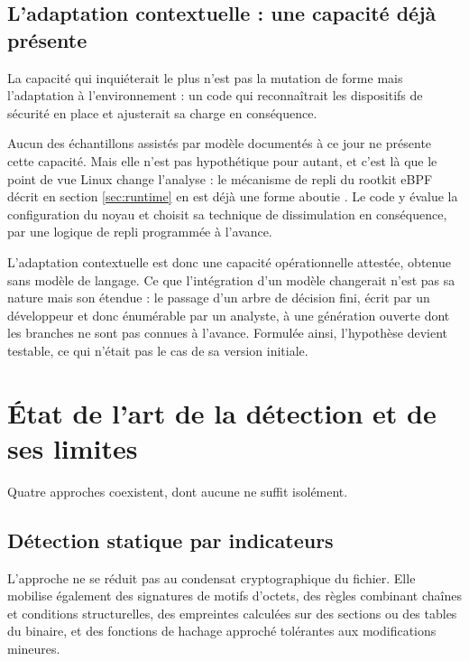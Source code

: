 \subsection{L'adaptation contextuelle : une capacité déjà présente}

La capacité qui inquiéterait le plus n'est pas la mutation de forme mais l'adaptation à l'environnement : un code qui reconnaîtrait les dispositifs de sécurité en place et ajusterait sa charge en conséquence.

Aucun des échantillons assistés par modèle documentés à ce jour ne présente cette capacité. Mais elle n'est pas hypothétique pour autant, et c'est là que le point de vue Linux change l'analyse : le mécanisme de repli du rootkit eBPF décrit en section \ref{sec:runtime} en est déjà une forme aboutie \cite{synacktiv2025}. Le code y évalue la configuration du noyau et choisit sa technique de dissimulation en conséquence, par une logique de repli programmée à l'avance.

L'adaptation contextuelle est donc une capacité opérationnelle attestée, obtenue sans modèle de langage. Ce que l'intégration d'un modèle changerait n'est pas sa nature mais son étendue : le passage d'un arbre de décision fini, écrit par un développeur et donc énumérable par un analyste, à une génération ouverte dont les branches ne sont pas connues à l'avance. Formulée ainsi, l'hypothèse devient testable, ce qui n'était pas le cas de sa version initiale.

\section{État de l'art de la détection et de ses limites}
\label{sec:detection}

Quatre approches coexistent, dont aucune ne suffit isolément.

\subsection{Détection statique par indicateurs}

L'approche ne se réduit pas au condensat cryptographique du fichier. Elle mobilise également des signatures de motifs d'octets, des règles combinant chaînes et conditions structurelles, des empreintes calculées sur des sections ou des tables du binaire, et des fonctions de hachage approché tolérantes aux modifications mineures.

